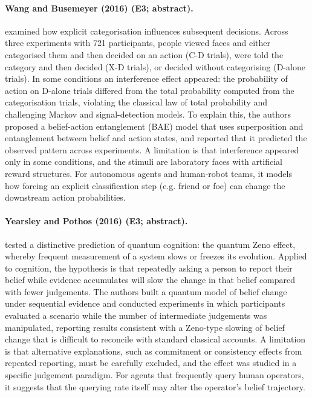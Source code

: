 \documentclass[10pt,a4paper]{article}
\begin{document}
\paragraph{Wang and Busemeyer (2016) (E3; abstract).} \citet{Wang2016} examined how explicit categorisation influences subsequent decisions. Across three experiments with 721 participants, people viewed faces and either categorised them and then decided on an action (C-D trials), were told the category and then decided (X-D trials), or decided without categorising (D-alone trials). In some conditions an interference effect appeared: the probability of action on D-alone trials differed from the total probability computed from the categorisation trials, violating the classical law of total probability and challenging Markov and signal-detection models. To explain this, the authors proposed a belief-action entanglement (BAE) model that uses superposition and entanglement between belief and action states, and reported that it predicted the observed pattern across experiments. A limitation is that interference appeared only in some conditions, and the stimuli are laboratory faces with artificial reward structures. For autonomous agents and human-robot teams, it models how forcing an explicit classification step (e.g. friend or foe) can change the downstream action probabilities.

\paragraph{Yearsley and Pothos (2016) (E3; abstract).} \citet{Yearsley2016b} tested a distinctive prediction of quantum cognition: the quantum Zeno effect, whereby frequent measurement of a system slows or freezes its evolution. Applied to cognition, the hypothesis is that repeatedly asking a person to report their belief while evidence accumulates will slow the change in that belief compared with fewer judgements. The authors built a quantum model of belief change under sequential evidence and conducted experiments in which participants evaluated a scenario while the number of intermediate judgements was manipulated, reporting results consistent with a Zeno-type slowing of belief change that is difficult to reconcile with standard classical accounts. A limitation is that alternative explanations, such as commitment or consistency effects from repeated reporting, must be carefully excluded, and the effect was studied in a specific judgement paradigm. For agents that frequently query human operators, it suggests that the querying rate itself may alter the operator's belief trajectory.
\end{document}
